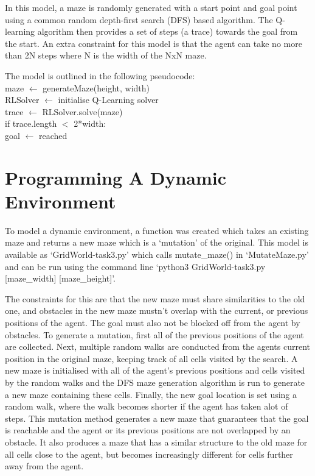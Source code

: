 \documentclass{article}
\begin{document}
In this model, a maze is randomly generated with a start point and goal point using a common random depth-first search (DFS) based algorithm. The Q-learning algorithm then provides a set of steps (a trace) towards the goal from the start. An extra constraint for this model is that the agent can take no more than 2N steps where N is the width of the NxN maze. 

The model is outlined in the following pseudocode:\\
\hspace*{4cm}maze $\leftarrow$ generateMaze(height, width)\\
\hspace*{4cm}RLSolver $\leftarrow$ initialise Q-Learning solver\\
\hspace*{4cm}trace $\leftarrow$ RLSolver.solve(maze)\\
\hspace*{4cm}if trace.length $<$ 2*width:\\
\hspace*{5cm}goal $\leftarrow$ reached


\section{Programming A Dynamic Environment}\label{sec:test-design}
	To model a dynamic environment, a function was created which takes an existing maze and returns a new maze which is a ‘mutation’ of the original. This model is available as ‘GridWorld-task3.py’ which calls mutate\_maze() in ‘MutateMaze.py’ and can be run using the command line ‘python3 GridWorld-task3.py [maze\_width] [maze\_height]’. 

	The constraints for this are that the new maze must share similarities to the old one, and obstacles in the new maze mustn’t overlap with the current, or previous positions of the agent. The goal must also not be blocked off from the agent by obstacles. To generate a mutation, first all of the previous positions of the agent are collected. Next, multiple random walks are conducted from the agents current position in the original maze, keeping track of all cells visited by the search. A new maze is initialised with all of the agent’s previous positions and cells visited by the random walks and the DFS maze generation algorithm is run to generate a new maze containing these cells. Finally, the new goal location is set using a random walk, where the walk becomes shorter if the agent has taken alot of steps. This mutation method generates a new maze that guarantees that the goal is reachable and the agent or its previous positions are not overlapped by an obstacle. It also produces a maze that has a similar structure to the old maze for all cells close to the agent, but becomes increasingly different for cells further away from the agent. 
\end{document}
